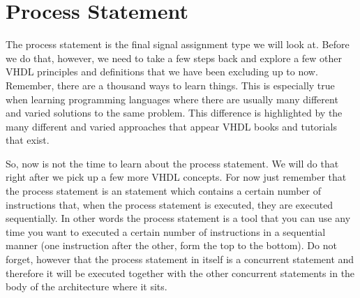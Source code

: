 \section{Process Statement}
The process statement is the final signal assignment type we will look at. Before we do that, however, we need to take a few steps back and explore a few other VHDL principles and definitions that we have been excluding up to now. Remember, there are a thousand ways to learn things. This is especially true when learning programming languages where there are usually many different and varied solutions to the same problem. This difference is highlighted by the many different and varied approaches that appear VHDL books and tutorials that exist. 

So, now is not the time to learn about the process statement. We will do that right after we pick up a few more VHDL concepts. For now just remember that the process statement is an statement which contains a certain number of instructions that, when the process statement is executed, they are executed sequentially. In other words the process statement is a tool that you can use any time you want to executed a certain number of instructions in a sequential manner (one instruction after the other, form the top to the bottom). Do not forget, however that the process statement in itself is a concurrent statement and therefore it will be executed together with the other concurrent statements in the body of the architecture where it sits.

